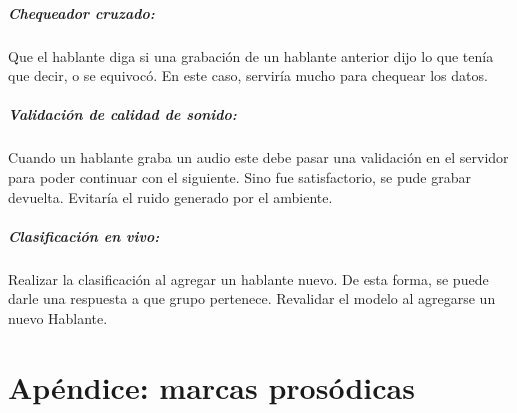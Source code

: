 \documentclass[11pt,a4paper,twoside]{tesis}
\begin{document}
\paragraph*{Chequeador cruzado:} Que el hablante diga si una grabación de un hablante anterior dijo lo que tenía que decir, o se equivocó. En este caso, serviría mucho para chequear los datos. 

\paragraph*{Validación de calidad de sonido:} Cuando un hablante graba un audio este debe pasar una validación en el servidor para poder continuar con el siguiente. Sino fue satisfactorio, se pude grabar devuelta. Evitaría el ruido generado por el ambiente. 

\paragraph*{Clasificación en vivo:} Realizar la clasificación al agregar un hablante nuevo. De esta forma, se puede darle una respuesta a que grupo pertenece. Revalidar el modelo al agregarse un nuevo Hablante. 

\chapter{Apéndice: marcas prosódicas}

\backmatter


 
\end{document}
